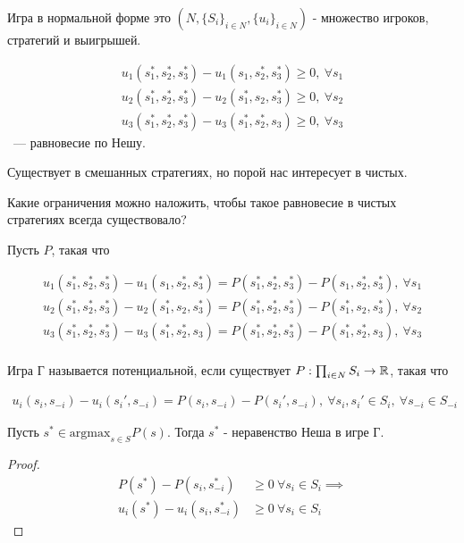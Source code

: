 \documentclass[../main.tex]{subfiles}
\begin{document}
\begin{remrk}
	Игра в нормальной форме это $(N, \{S_i\}_{i \in N}, \{u_i\}_{i \in N})$ - множество игроков, стратегий и выигрышей.

	\begin{align*}
		u_1(s_1^*, s_2^*, s_3^*) - u_1(s_1, s_2^*, s_3^*) \geqslant 0, \ \forall s_1 \\
		u_2(s_1^*, s_2^*, s_3^*) - u_2(s_1^*, s_2, s_3^*) \geqslant 0, \ \forall s_2 \\
		u_3(s_1^*, s_2^*, s_3^*) - u_3(s_1^*, s_2^*, s_3) \geqslant 0, \ \forall s_3
	\end{align*} ~--- равновесие по Нешу.

	Существует в смешанных стратегиях, но порой нас интересует в чистых.

	Какие ограничения можно наложить, чтобы такое равновесие в чистых стратегиях всегда существовало?


\end{remrk}


Пусть $P$, такая что 

\begin{align*}
	u_1(s_1^*, s_2^*, s_3^*) - u_1(s_1, s_2^*, s_3^*) = P(s_1^*, s_2^*, s_3^*) - P(s_1, s_2^*, s_3^*), \ \forall s_1 \\
	u_2(s_1^*, s_2^*, s_3^*) - u_2(s_1^*, s_2, s_3^*) = P(s_1^*, s_2^*, s_3^*) - P(s_1^*, s_2, s_3^*), \ \forall s_2 \\
	u_3(s_1^*, s_2^*, s_3^*) - u_3(s_1^*, s_2^*, s_3) = P(s_1^*, s_2^*, s_3^*) - P(s_1^*, s_2^*, s_3), \ \forall s_3 \\
\end{align*}

\begin{df}
	Игра Г называется потенциальной, если существует $P : \prod_{i \in N} S_i \to \mathbb{R}$, такая что 

	\begin{align*}
		u_i(s_i, s_{-i}) - u_i(s_i', s_{-i}) = P(s_i, s_{-i}) - P(s_i', s_{-i}), \ \forall s_i, s_i' \in S_i, \ \forall s_{-i} \in S_{-i}
	\end{align*}

\end{df}

\begin{claim}
	Пусть $s^* \in \text{argmax}_{s \in S} P(s)$.
	Тогда  $s^*$ - неравенство Неша в игре Г. 
\end{claim}

\begin{proof}
	\begin{align*}
		P(s^*) - P(s_i, s_{-i}^*) &\geqslant 0 \ \forall s_i \in S_i \implies \\
		u_i(s^*) - u_i(s_i, s^*_{-i}) &\geqslant 0 \ \forall s_i \in S_i
	\end{align*}
\end{proof}
\end{document}
